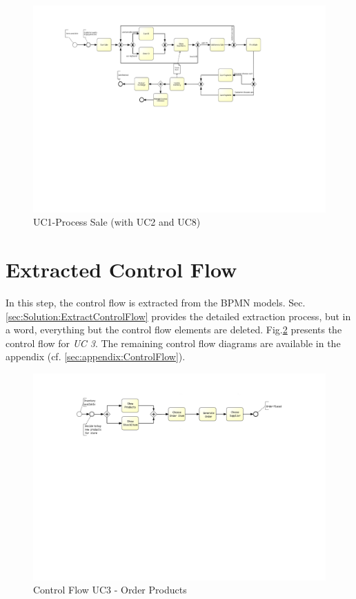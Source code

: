 \begin{figure}[h!]
	\centering
	\includegraphics[width=\textwidth, trim={4cm 10.5cm 8cm 2cm}]{img/UC1.pdf}
	\caption{UC1-Process Sale (with UC2 and UC8)}
	\label{fig:UC1}
\end{figure}




\section{Extracted Control Flow}
\label{sec:SolutionApplication:ExtractDataFlow}
In this step, the control flow is extracted from the BPMN models. Sec. \ref{sec:Solution:ExtractControlFlow} provides the detailed extraction process, but in a word, everything but the control flow elements are deleted. Fig.\ref{fig:UC3Control} presents the control flow for \textit{UC 3}. The remaining control flow diagrams are available in the appendix (cf. \ref{sec:appendix:ControlFlow}).  

\begin{figure}[h!]
	\centering
	\includegraphics[width=\textwidth, trim={5cm 14cm 6cm 2cm}]{img/UC3Control.pdf}
	\caption{Control Flow UC3 - Order Products}
	\label{fig:UC3Control}
\end{figure}

